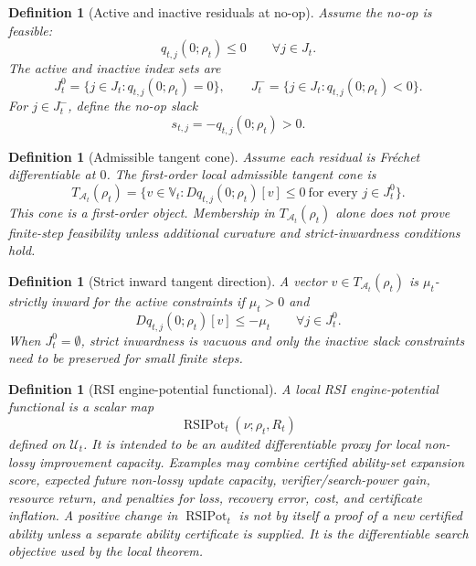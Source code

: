\documentclass[11pt]{article}
\newtheorem{definition}[theorem]{Definition}
\newcommand{\1}{\mathbf{1}}
\begin{document}
\begin{definition}[Active and inactive residuals at no-op]
\label{def:active_inactive_residuals}
Assume the no-op is feasible:
\[
q_{t,j}(0;\rho_t)\le0
\qquad\forall j\in J_t.
\]
The active and inactive index sets are
\[
J_t^{0}=\{j\in J_t:q_{t,j}(0;\rho_t)=0\},
\qquad
J_t^{-}=\{j\in J_t:q_{t,j}(0;\rho_t)<0\}.
\]
For \(j\in J_t^-\), define the no-op slack
\[
s_{t,j}=-q_{t,j}(0;\rho_t)>0.
\]
\end{definition}

\begin{definition}[Admissible tangent cone]
\label{def:admissible_tangent_cone}
Assume each residual is Fr\'echet differentiable at \(0\).  The first-order local admissible tangent cone is
\[
\boxed{
T_{\mathcal A_t}(\rho_t)
=
\{v\in\mathbb V_t:
Dq_{t,j}(0;\rho_t)[v]\le0\ \text{for every }j\in J_t^{0}\}.
}
\]
This cone is a first-order object.  Membership in \(T_{\mathcal A_t}(\rho_t)\) alone does not prove finite-step feasibility unless additional curvature and strict-inwardness conditions hold.
\end{definition}

\begin{definition}[Strict inward tangent direction]
\label{def:strict_inward_tangent_direction}
A vector \(v\in T_{\mathcal A_t}(\rho_t)\) is \(\mu_t\)-strictly inward for the active constraints if \(\mu_t>0\) and
\[
Dq_{t,j}(0;\rho_t)[v]\le-\mu_t
\qquad\forall j\in J_t^{0}.
\]
When \(J_t^0=\emptyset\), strict inwardness is vacuous and only the inactive slack constraints need to be preserved for small finite steps.
\end{definition}

\begin{definition}[RSI engine-potential functional]
\label{def:rsi_potential_functional}
A local RSI engine-potential functional is a scalar map
\[
\operatorname{RSIPot}_t(\nu;\rho_t,R_t)
\]
defined on \(\mathcal U_t\).  It is intended to be an audited differentiable proxy for local non-lossy improvement capacity.  Examples may combine certified ability-set expansion score, expected future non-lossy update capacity, verifier/search-power gain, resource return, and penalties for loss, recovery error, cost, and certificate inflation.  A positive change in \(\operatorname{RSIPot}_t\) is not by itself a proof of a new certified ability unless a separate ability certificate is supplied.  It is the differentiable search objective used by the local theorem.
\end{definition}
\end{document}

